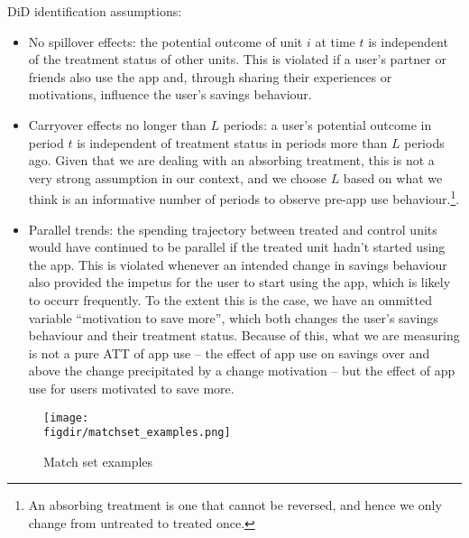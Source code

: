 DiD identification assumptions:
\begin{itemize}
    \item No spillover effects: the potential outcome of unit $i$ at time $t$
        is independent of the treatment status of other units. This is violated
        if a user's partner or friends also use the app and, through sharing
        their experiences or motivations, influence the user's savings
        behaviour.

    \item Carryover effects no longer than $L$ periods: a user's potential
        outcome in period $t$ is independent of treatment status in periods
        more than $L$ periods ago. Given that we are dealing with an absorbing
        treatment, this is not a very strong assumption in our context, and we
        choose $L$ based on what we think is an informative number of periods
        to observe pre-app use behaviour.\footnote{An absorbing treatment is
            one that cannot be reversed, and hence we only change from
            untreated to treated once.}.

    \item Parallel trends: the spending trajectory between treated and control
        units would have continued to be parallel if the treated unit hadn't
        started using the app. This is violated whenever an intended change in
        savings behaviour also provided the impetus for the user to start using
        the app, which is likely to occurr frequently. To the extent this is
        the case, we have an ommitted variable ``motivation to save more'',
        which both changes the user's savings behaviour and their treatment
        status. Because of this, what we are measuring is not a pure ATT of app
        use -- the effect of app use on savings over and above the change
        precipitated by a change motivation -- but the effect of app use for
        users motivated to save more.

\end{itemize}


\begin{figure}[htpb]
    \centering
    \caption{Match set examples}%
    \texttt{[image: \\figdir/matchset\_examples.png]}
    \label{fig:matchset_examples}

    \fignote{\textwidth}{}

\end{figure}


